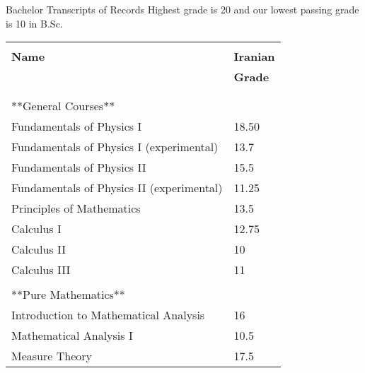\begin{cSection}{Bachelor Transcripts of Records}
Highest grade is 20 and our lowest passing grade is 10 in B.Sc.\\
	\begin{tabular}{ @{} l l }
		&\\%
	\textbf{Name} & \textbf{Iranian} \\%
	& \textbf{Grade} \\%
	\\\cline{1-2}\\
	**General Courses** &\\%
	‫‪Fundamentals of Physics I & 18.50 \\%
	Fundamentals of Physics I (experimental) & 13.7 \\%
	Fundamentals of Physics II & 15.5 \\%
	Fundamentals of Physics II (experimental) & 11.25 \\%
	
	Principles of Mathematics & 13.5 \\%
	
	Calculus I & 12.75 \\%
	Calculus II & 10 \\%
	Calculus III & 11 \\%
	\cline{1-2}\\
	
	**Pure Mathematics**&\\%
	Introduction to Mathematical Analysis & 16 \\%
	Mathematical Analysis I & 10.5 \\%
	Measure Theory & 17.5 \\%
	

\end{tabular}
\end{cSection}
